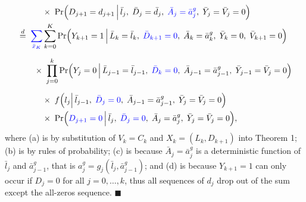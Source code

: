 \begin{align*}
        &\quad\quad\quad \times\;
        \Pr\Bigl(D_{j+1}=d_{j+1} \,\Big|\,\bar{l}_{j},\;\bar{D}_j = \bar{d}_{j},\; {\color{blue}\bar{A}_{j} = \bar{a}^g_{j}},\; \bar{Y}_{j} =\bar{V}_j = 0 \Bigr)\\
        &\stackrel{d}{=}\;
        {\color{blue}\sum_{\bar{x}_K}} \sum_{k=0}^K 
              \Pr\Bigl(Y_{k+1} = 1 \,\Big|\,\bar{L}_k = \bar{l}_k,\;{\color{blue}\bar{D}_{k+1}=0},\;\bar{A}_k=\bar{a}^g_k,\; \bar{Y}_k=0,\;\bar{V}_{k+1}=0 \Bigr) \\[6pt]
          &\quad\quad \times\;
          \prod_{j=0}^{k} \Pr\Bigl(Y_j=0 \,\Big|\, \bar{L}_{j-1} = \bar{l}_{j-1},\;{\color{blue}\bar{D}_{k}=0},\;\bar{A}_{j-1} = \bar{a}^g_{j-1},\;\bar{Y}_{j-1} = \bar{V}_j = 0 \Bigr) \\[6pt]
          &\quad\quad\quad \times\;
            f\Bigl(l_j \Big|\,\bar{l}_{j-1},\;{\color{blue}\bar{D}_{j}=0},\; \bar{A}_{j-1} = \bar{a}^g_{j-1},\; \bar{Y}_{j} =\bar{V}_j = 0 \Bigr)\\
        &\quad\quad\quad \times\;
        \Pr\Bigl({\color{blue}D_{j+1}=0} \,\Big|\,\bar{l}_{j},\;{\color{blue}\bar{D}_j = 0},\; \bar{A}_{j} = \bar{a}^g_{j},\; \bar{Y}_{j} =\bar{V}_j = 0 \Bigr),
\end{align*}
where (a) is by substitution of $V_k = C_k$ and $X_k = (L_k,D_{k+1})$ into Theorem 1; (b) is by rules of probability; (c) is because $\bar{A}_j = \bar{a}_j^g$ is a deterministic function of $\bar{l}_j$ and $\bar{a}^g_{j-1}$, that is $a_j^g=g_j(\bar{l}_j,\bar{a}^g_{j-1})$; and (d) is because $Y_{k+1}=1$ can only occur if $D_j=0$ for all $j=0,\ldots,k$, thus all sequences of $d_j$ drop out of the sum except the all-zeros sequence. \(\blacksquare\) 